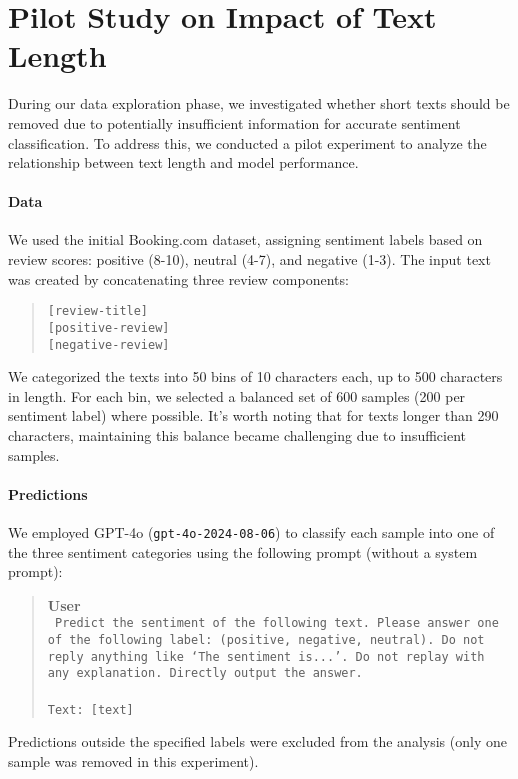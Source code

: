 \section{Pilot Study on Impact of Text Length\label{app:length-exp}}
During our data exploration phase, we investigated whether short texts should be removed due to potentially insufficient information for accurate sentiment classification.
To address this, we conducted a pilot experiment to analyze the relationship between text length and model performance.

\paragraph{Data}
We used the initial Booking.com dataset, assigning sentiment labels based on review scores:
positive (8-10), neutral (4-7), and negative (1-3).
The input text was created by concatenating three review components:
\begin{quote}
    \small
    \texttt{[review-title]}\\
    \texttt{[positive-review]}\\
    \texttt{[negative-review]}
\end{quote}
We categorized the texts into 50 bins of 10 characters each, up to 500 characters in length.
For each bin, we selected a balanced set of 600 samples (200 per sentiment label) where possible.
It's worth noting that for texts longer than 290 characters, maintaining this balance became challenging due to insufficient samples.

\paragraph{Predictions}
We employed GPT-4o (\texttt{gpt-4o-2024-08-06}) to classify each sample into one of the three sentiment categories using the following prompt (without a system prompt):
\begin{quote}
    \small
    \textbf{User} \\
    \texttt{
        Predict the sentiment of the following text. Please answer one of the following label: (positive, negative, neutral). Do not reply anything like `The sentiment is...'. Do not replay with any explanation. Directly output the answer. \\ \\
        Text: [text]
    }
\end{quote}
Predictions outside the specified labels were excluded from the analysis (only one sample was removed in this experiment).


